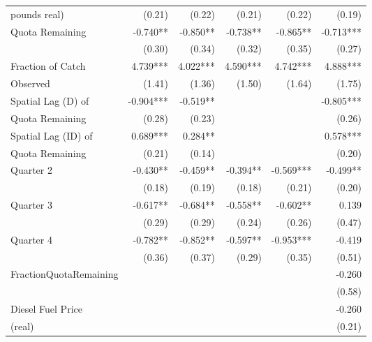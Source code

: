 {\begin{tabular}{l*{5}{r}}
pounds real)        &      (0.21)   &      (0.22)   &      (0.21)   &      (0.22)   &      (0.19)   \\
Quota Remaining     &      -0.740** &      -0.850** &      -0.738** &      -0.865** &      -0.713***\\
                    &      (0.30)   &      (0.34)   &      (0.32)   &      (0.35)   &      (0.27)   \\
Fraction of Catch   &       4.739***&       4.022***&       4.590***&       4.742***&       4.888***\\
Observed            &      (1.41)   &      (1.36)   &      (1.50)   &      (1.64)   &      (1.75)   \\
Spatial Lag (D) of  &      -0.904***&      -0.519** &               &               &      -0.805***\\
Quota Remaining     &      (0.28)   &      (0.23)   &               &               &      (0.26)   \\
Spatial Lag (ID) of &       0.689***&       0.284** &               &               &       0.578***\\
Quota Remaining     &      (0.21)   &      (0.14)   &               &               &      (0.20)   \\
Quarter 2           &      -0.430** &      -0.459** &      -0.394** &      -0.569***&      -0.499** \\
                    &      (0.18)   &      (0.19)   &      (0.18)   &      (0.21)   &      (0.20)   \\
Quarter 3           &      -0.617** &      -0.684** &      -0.558** &      -0.602** &       0.139   \\
                    &      (0.29)   &      (0.29)   &      (0.24)   &      (0.26)   &      (0.47)   \\
Quarter 4           &      -0.782** &      -0.852** &      -0.597** &      -0.953***&      -0.419   \\
                    &      (0.36)   &      (0.37)   &      (0.29)   &      (0.35)   &      (0.51)   \\
FractionQuotaRemaining&               &               &               &               &      -0.260   \\
                    &               &               &               &               &      (0.58)   \\
Diesel Fuel Price   &               &               &               &               &      -0.260   \\
(real)              &               &               &               &               &      (0.21)   \\

\end{tabular}}
